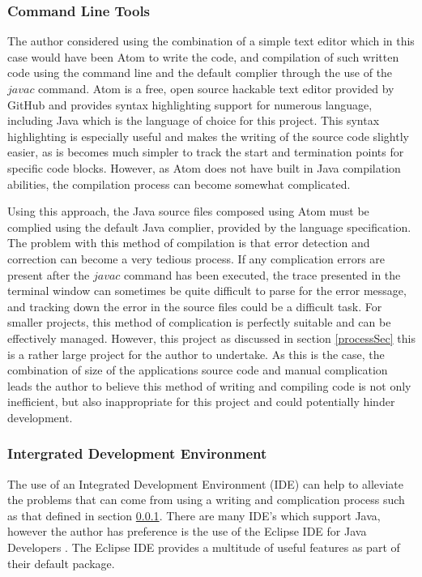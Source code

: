 \subsubsection{Command Line Tools}
\label{sseccmd}
The author considered using the combination of a simple text editor which in this case would have been Atom\cite{atom:textEditor} to write the code, and compilation of such written code using the command line and the default complier through the use of the $javac$ command. Atom is a free, open source hackable text editor provided by GitHub and provides syntax highlighting support for numerous language, including Java which is the language of choice for this project. This syntax highlighting is especially useful and makes the writing of the source code slightly easier, as is becomes much simpler to track the start and termination points for specific code blocks. However, as Atom does not have built in Java compilation abilities, the compilation process can become somewhat complicated.

Using this approach, the Java source files composed using Atom must be complied using the default Java complier, provided by the language specification. The problem with this method of compilation is that error detection and correction can become a very tedious process. If any complication errors are present after the $javac$ command has been executed, the trace presented in the terminal window can sometimes be quite difficult to parse for the error message, and tracking down the error in the source files could be a difficult task. For smaller projects, this method of complication is perfectly suitable and can be effectively managed. However, this project as discussed in section \ref{processSec} this is a rather large project for the author to undertake. As this is the case, the combination of size of the applications source code and manual complication leads the author to believe this method of writing and compiling code is not only inefficient, but also inappropriate for this project and could potentially hinder development.

\subsubsection{Intergrated Development Environment}

The use of an Integrated Development Environment (IDE) can help to alleviate the problems that can come from using a writing and complication process such as that defined in section \ref{sseccmd}. There are many IDE's which support Java, however the author has preference is the use of the Eclipse IDE for Java Developers \cite{eclipse:IDE}. The Eclipse IDE provides a multitude of useful features as part of their default package. 

